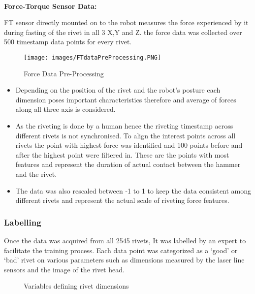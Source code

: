 \documentclass{article}
\begin{document}
\\\textbf{Force-Torque Sensor Data: }
    
FT sensor directly mounted on to the robot measures the force experienced by it during fasting of the rivet in all 3 X,Y and Z. the force data was collected over 500 timestamp data points for every rivet.



\begin{figure}[H]
    \centering
    \texttt{[image: images/FTdataPreProcessing.PNG]}
    \caption{Force Data Pre-Processing}
    \label{fig: FtDAtaPreProcessing}
\end{figure}

\begin{itemize}
    \item Depending on the position of the rivet and the robot’s posture each dimension poses important characteristics therefore and average of forces along all three axis is considered.
    \item As the riveting is done by a human hence the riveting timestamp across different rivets is not synchronised. To align the interest  points across all rivets the point with highest  force was identified and 100 points before and after the highest point were filtered in. These are the points with most features and represent the duration of actual contact between the hammer and the  rivet.
    \item The data was also rescaled between -1 to 1 to keep the data consistent among different rivets and represent the actual scale of riveting force features.
\end{itemize}

\subsubsection{Labelling}

Once the data was acquired from all 2545 rivets, It was labelled by an expert to facilitate  the training process. Each data point was categorized as a ‘good’ or ‘bad’ rivet on various parameters such as dimensions measured by the laser line sensors and the image of the rivet head.

\begin{figure}[H]
  \centering
  \hfill
  \caption{Variables defining rivet dimensions}
  \label{fig:RivetLabelVariable}
\end{figure}
\end{document}
